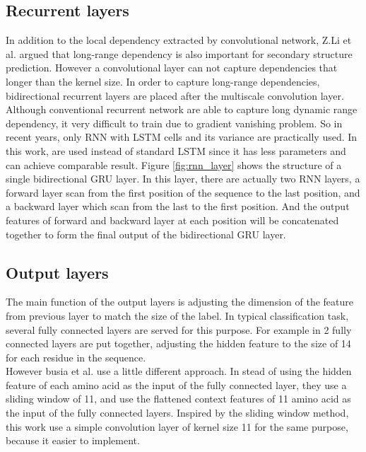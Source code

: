 \subsection{Recurrent layers}
In addition to the local dependency extracted by convolutional network, Z.Li et al. \cite{Z.Li2016} argued that long-range dependency is also important for secondary structure prediction. However a convolutional layer can not capture dependencies that longer than the kernel size. In order to capture long-range dependencies, bidirectional recurrent layers are placed after the multiscale convolution layer. Although conventional recurrent network are able to capture long dynamic range dependency, it very difficult to train due to gradient vanishing problem. So in recent years, only RNN with LSTM cells and its variance are practically used. In this work, are used instead of standard LSTM since it has less parameters and can achieve comparable result\cite{zaremba2015empirical}. Figure \ref{fig:rnn_layer} shows the structure of a single bidirectional GRU layer. In this layer, there are actually two RNN layers, a forward layer scan from the first position of the sequence to the last position, and a backward layer which scan from the last to the first position. And the output features of forward and backward layer at each position will be concatenated together to form the final output of the bidirectional GRU layer.\par



\subsection{Output layers}\label{sec:output_layer}
The main function of the output layers is adjusting the dimension of the feature from previous layer to match the size of the label. In typical classification task, several fully connected layers are served for this purpose. For example in \cite{Z.Li2016} 2 fully connected layers are put together, adjusting the hidden feature to the size of 14 for each residue in the sequence. \\
However busia et al. \cite{busia2016protein} use a little different approach. In stead of using the hidden feature of each amino acid as the input of the fully connected layer, they use a sliding window of 11, and use the flattened context features of 11 amino acid as the input of the fully connected layers. Inspired by the sliding window method,  this work use a simple convolution layer of kernel size 11 for the same purpose, because it easier to implement.\par

